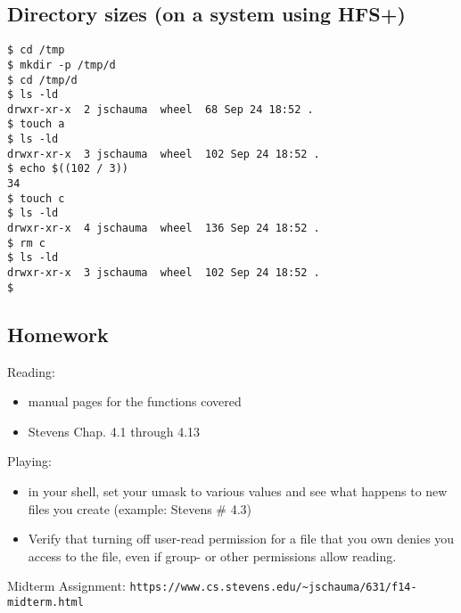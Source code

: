 \documentclass[xga]{xdvislides}
\begin{document}
\subsection{Directory sizes (on a system using HFS+)}
\begin{verbatim}
$ cd /tmp
$ mkdir -p /tmp/d
$ cd /tmp/d
$ ls -ld
drwxr-xr-x  2 jschauma  wheel  68 Sep 24 18:52 .
$ touch a
$ ls -ld
drwxr-xr-x  3 jschauma  wheel  102 Sep 24 18:52 .
$ echo $((102 / 3))
34
$ touch c
$ ls -ld
drwxr-xr-x  4 jschauma  wheel  136 Sep 24 18:52 .
$ rm c
$ ls -ld
drwxr-xr-x  3 jschauma  wheel  102 Sep 24 18:52 .
$
\end{verbatim}

\subsection{Homework}
Reading:
\begin{itemize}
	\item manual pages for the functions covered
	\item Stevens Chap. 4.1 through 4.13
\end{itemize}
Playing:
\begin{itemize}
	\item in your shell, set your umask to various values and see what
          happens to new files you create (example: Stevens \# 4.3)
	\item Verify that turning off user-read permission for a file that you own
		denies you access to the file, even if group- or other permissions
		allow reading.
\end{itemize}
\addvspace{.5in}
Midterm Assignment:
\verb+https://www.cs.stevens.edu/~jschauma/631/f14-midterm.html+
\end{document}
